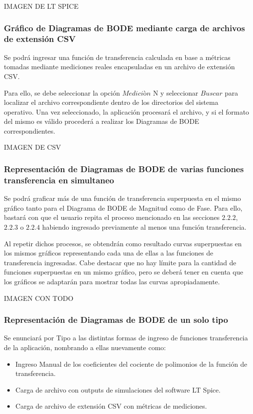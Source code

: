 IMAGEN DE LT SPICE

\subsubsection{Gráfico de Diagramas de BODE mediante carga de archivos de extensión CSV}

Se podrá ingresar una función de transferencia calculada en base a métricas tomadas mediante mediciones reales encapsuladas en un archivo de extensión CSV.

Para ello, se debe seleccionar la opción $Mediciòn$ N y seleccionar $Buscar$ para localizar el archivo correspondiente dentro de los directorios del sistema operativo. 
Una vez seleccionado, la aplicación procesará el archivo, y si el formato del mismo es válido procederá a realizar los Diagramas de BODE correspondientes.

IMAGEN DE CSV

\subsubsection{Representación de Diagramas de BODE de varias funciones transferencia en simultaneo}

Se podrá graficar más de una función de transferencia superpuesta en el mismo gráfico tanto para el Diagrama de BODE de Magnitud como de Fase.
Para ello, bastará con que el usuario repita el proceso mencionado en las secciones $2.2.2$, $2.2.3$ o $2.2.4$ habiendo ingresado previamente al menos una función transferencia.

Al repetir dichos procesos, se obtendrán como resultado curvas superpuestas en los mismos gráficos representando cada una de ellas a las funciones de transferencia ingresadas. 
Cabe destacar que no hay límite para la cantidad de funciones superpuestas en un mismo gráfico, pero se deberá tener en cuenta que los gráficos se adaptarán para mostrar todas las curvas apropiadamente.

IMAGEN CON TODO

\subsubsection{Representación de Diagramas de BODE de un solo tipo}

Se enunciará por Tipo a las distintas formas de ingreso de funciones transferencia de la aplicación, nombrando a ellas nuevamente como:

\begin{itemize}
    \item Ingreso Manual de los coeficientes del cociente de polimonios de la función de transferencia.
    \item Carga de archivo con outputs de simulaciones del software LT Spice.
    \item Carga de archivo de extensión CSV con métricas de mediciones. 

\end{itemize}

